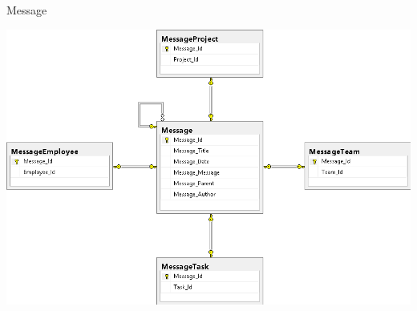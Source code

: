 \begin{frame}{Message}
  \begin{center}
    \includegraphics[height=0.9\textheight]{images/database/Message.png}
  \end{center}
\end{frame}